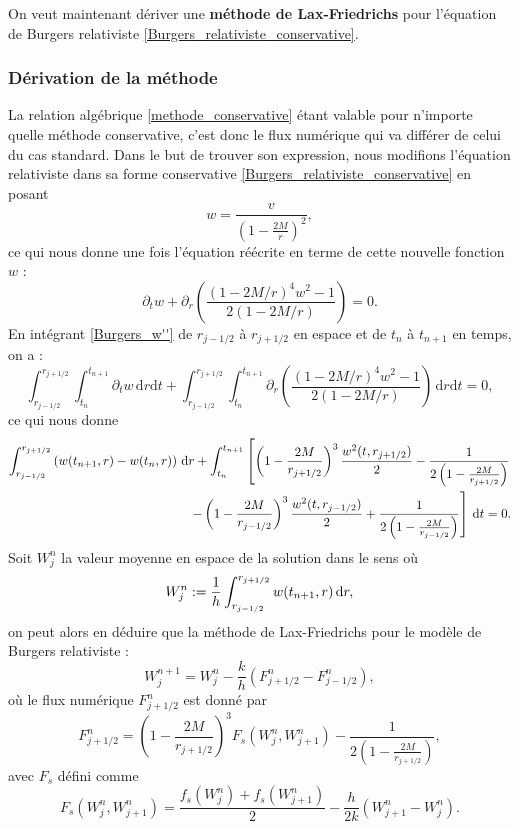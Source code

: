 \documentclass[11pt,a4paper]{article}
\begin{document}
On veut maintenant dériver une \textbf{méthode de Lax-Friedrichs} pour l'équation de Burgers relativiste \eqref{Burgers_relativiste_conservative}.

\subsubsection{Dérivation de la méthode}

La relation algébrique \eqref{methode_conservative} étant valable pour n'importe quelle méthode conservative, c'est donc le flux numérique qui va différer de celui du cas standard.
Dans le but de trouver son expression, nous modifions l'équation relativiste dans sa forme conservative \eqref{Burgers_relativiste_conservative} en posant
 \begin{equation}\label{w_expr}
w = \frac{v}{(1-\frac{2M}{r})^2} , 
\end{equation}
ce qui nous donne une fois l'équation réécrite en terme de cette nouvelle fonction $w$ : 
\begin{equation}\label{Burgers_w''}
\partial_tw + \partial_r\left(\frac{\left(1-2M/ r\right)^4w^2 - 1}{2\left(1-2M/ r\right)}\right)=0. 
\end{equation}
En intégrant \eqref{Burgers_w''} de $r_{j-1/2}$ à $r_{j+1/2}$ en espace et de $t_n$ à $t_{n+1}$ en temps, on a :
\[ 
\int_{r_{j-1/2}}^{r_{j+1/2}}
	\int_{t_n}^{t_{n+1}}
		\partial_t w 
	\,\mathrm{d}r
\mathrm{d}t
+\int_{r_{j-1/2}}^{r_{j+1/2}}
	\int_{t_n}^{t_{n+1}}
		\partial_r\left(
			\frac{\left(1-2M/r\right)^4 w^2-1}{2\left(1-2M/r\right)}
				  \right)
	\,\mathrm{d}r
\mathrm{d}t
= 0, 
\]
ce qui nous donne 
\[
\aligned 
\int_{r_{j-1/2}}^{r_{j+1/2}}
	\left(
		w(t_{n+1},r)-w(t_n,r)
	\right) 
\,\mathrm{d}r
+ 
\int_{t_n}^{t_{n+1}}
	\left[
		\left(
			1-\frac{2M}{r_{j+1/2}}
		\right)^3
		\frac{w^2(t,r_{j+1/2})}{2}
		-\frac{1}{2\left(1-\frac{2M}{r_{j+1/2}}\right)}
	\right. \\
	\left.
		-\left(
			1-\frac{2M}{r_{j-1/2}}
		\right)^3
		\frac{w^2(t,r_{j-1/2})}{2}
		+\frac{1}{2\left(1-\frac{2M}{r_{j-1/2}}\right)}
	\right]
\,\mathrm{d}t \nonumber
= 0.
\endaligned 
\] 
Soit $W_j^n$ la valeur moyenne en espace de la solution dans le sens où 
\begin{equation}\label{W}
W_j^n : =  {1\over h}\int_{r_{j-1/2}}^{r_{j+1/2}}
w(t_{n+1},r)	
\,\mathrm{d}r, 
\end{equation}
on peut alors en déduire que la méthode de Lax-Friedrichs pour le modèle de Burgers relativiste :
\begin{equation}\label{Lax-Friedrichs}
W_j^{n+1} =   W_j^n
            - \frac{k}{h}\left(F_{j+1/2}^n- F_{j-1/2}^n
 \right) \nonumber,		    
\end{equation}
où le flux numérique $F^n_{j+1/2}$ est donné par
\begin{equation}\label{rnff}
	F_{j + 1/2}^n
	=
	  \left(
          1-\frac{2M}{r_{j + 1/2}}
      \right)^3 F_s(W_j^n,W_{j + 1}^n) 
    - \frac{1}{2\left(1-\frac{2M}{r_{j+ 1/2}}\right)},
\end{equation}
avec $F_s$ défini comme
\begin{equation}\label{F_c}
F_s(W_j^n,W_{j+1}^n)
= \frac{f_s(W_j^n) + f_s(W_{j+1}^n)}{2}-\frac{h}{2k}(W_{j+1}^n-W_j^n). 
\end{equation}
\end{document}
